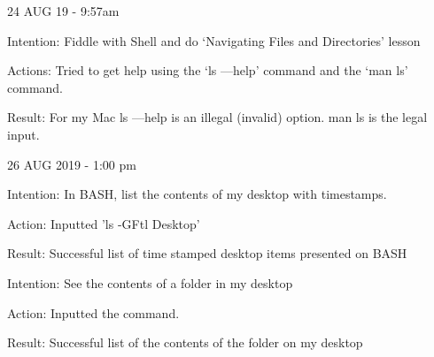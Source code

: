24 AUG 19 - 9:57am

Intention: Fiddle with Shell and do ‘Navigating Files and Directories’ lesson

Actions: Tried to get help using the ‘ls —help’ command and the ‘man ls’ command.

Result: For my Mac ls —help is an illegal (invalid) option. man ls is the legal input.


26 AUG 2019 - 1:00 pm

Intention: In BASH, list the contents of my desktop with timestamps.

Action: Inputted 'ls -GFtl Desktop'

Result: Successful list of time stamped desktop items presented on BASH

Intention: See the contents of a folder in my desktop

Action: Inputted the command.

Result: Successful list of the contents of the folder on my desktop



